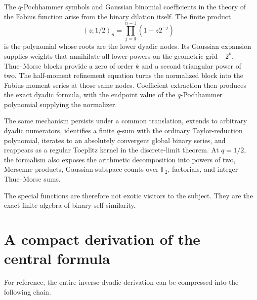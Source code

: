 \documentclass[11pt]{article}
\theoremstyle{definition}
\newcommand{\qpoch}[3]{\left(#1;#2\right)_{#3}}
\begin{document}
The $q$-Pochhammer symbols and Gaussian binomial coefficients in the theory of the Fabius function arise from the binary dilation itself.  The finite product
\[
  \qpoch{z}{1/2}{n}=\prod_{j=0}^{n-1}(1-z2^{-j})
\]
is the polynomial whose roots are the lower dyadic nodes.  Its Gaussian expansion supplies weights that annihilate all lower powers on the geometric grid $-2^k$.  Thue--Morse blocks provide a zero of order $k$ and a second triangular power of two.  The half-moment refinement equation turns the normalized block into the Fabius moment series at those same nodes.  Coefficient extraction then produces the exact dyadic formula, with the endpoint value of the $q$-Pochhammer polynomial supplying the normalizer.

The same mechanism persists under a common translation, extends to arbitrary dyadic numerators, identifies a finite $q$-sum with the ordinary Taylor-reduction polynomial, iterates to an absolutely convergent global binary series, and reappears as a regular Toeplitz kernel in the discrete-limit theorem.  At $q=1/2$, the formalism also exposes the arithmetic decomposition into powers of two, Mersenne products, Gaussian subspace counts over $\mathbb F_2$, factorials, and integer Thue--Morse sums.

The special functions are therefore not exotic visitors to the subject.  They are the exact finite algebra of binary self-similarity.

\appendix

\section{A compact derivation of the central formula}
\label{app:compact-derivation}

For reference, the entire inverse-dyadic derivation can be compressed into the following chain.
\end{document}
